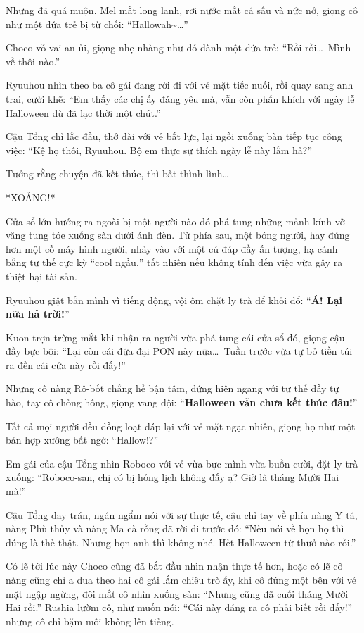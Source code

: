 \documentclass[../main.tex]{subfiles}
\begin{document}
Nhưng đã quá muộn. Mel mắt long lanh, rơi nước mắt cá sấu và nức nở, giọng cô như một đứa trẻ bị từ chối: ``Hallowah\~{}\dots''

Choco vỗ vai an ủi, giọng nhẹ nhàng như dỗ dành một đứa trẻ: ``Rồi rồi\dots\ Mình về thôi nào.''


Ryuuhou nhìn theo ba cô gái đang rời đi với vẻ mặt tiếc nuối, rồi quay sang anh trai, cười khẽ: ``Em thấy các chị ấy đáng yêu mà, vẫn còn phấn khích với ngày lễ Halloween dù đã lạc thời một chút.''

Cậu Tổng chỉ lắc đầu, thở dài với vẻ bất lực, lại ngồi xuống bàn tiếp tục công việc: ``Kệ họ thôi, Ryuuhou. Bộ em thực sự thích ngày lễ này lắm hả?''

Tưởng rằng chuyện đã kết thúc, thì bất thình lình\dots

*XOẢNG!*

Cửa sổ lớn hướng ra ngoài bị một người nào đó phá tung những mảnh kính vỡ văng tung tóe xuống sàn dưới ánh đèn. Từ phía sau, một bóng người, hay đúng hơn một cỗ máy hình người, nhảy vào với một cú đáp đầy ấn tượng, hạ cánh bằng tư thế cực kỳ ``cool ngầu,'' tất nhiên nếu không tính đến việc vừa gây ra thiệt hại tài sản.

Ryuuhou giật bắn mình vì tiếng động, vội ôm chặt ly trà để khỏi đổ: ``\textbf{Á! Lại nữa hả trời!}''

Kuon trợn trừng mắt khi nhận ra người vừa phá tung cái cửa sổ đó, giọng cậu đầy bực bội: ``Lại còn cái đứa đại PON này nữa\dots\ Tuần trước vừa tự bỏ tiền túi ra đền cái cửa này rồi đấy!''

Nhưng cô nàng Rô-bốt chẳng hề bận tâm, đứng hiên ngang với tư thế đầy tự hào, tay cô chống hông, giọng vang dội: ``\textbf{Halloween vẫn chưa kết thúc đâu!}''


Tất cả mọi người đều đồng loạt đáp lại với vẻ mặt ngạc nhiên, giọng họ như một bản hợp xướng bất ngờ: ``Hallow!?''

Em gái của cậu Tổng nhìn Roboco với vẻ vừa bực mình vừa buồn cười, đặt ly trà xuống: ``Roboco-san, chị có bị hỏng lịch không đấy ạ? Giờ là tháng Mười Hai mà!''

Cậu Tổng day trán, ngán ngẩm nói với sự thực tế, cậu chỉ tay về phía nàng Y tá, nàng Phù thủy và nàng Ma cà rồng đã rời đi trước đó: ``Nếu nói về bọn họ thì đúng là thế thật. Nhưng bọn anh thì không nhé. Hết Halloween từ thưở nào rồi.''

Có lẽ tới lúc này Choco cũng đã bắt đầu nhìn nhận thực tế hơn, hoặc có lẽ cô nàng cũng chỉ a dua theo hai cô gái lắm chiêu trò ấy, khi cô đứng một bên với vẻ mặt ngập ngừng, đôi mắt cô nhìn xuống sàn: ``Nhưng cũng đã cuối tháng Mười Hai rồi.'' Rushia lườm cô, như muốn nói: ``Cái này đáng ra cô phải biết rồi đấy!'' nhưng cô chỉ bặm môi không lên tiếng.
\end{document}
